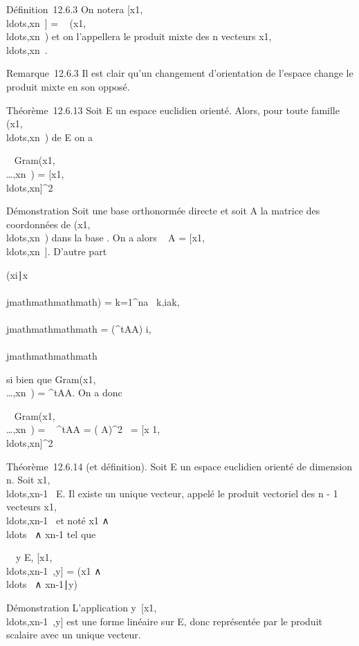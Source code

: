 Définition~12.6.3 On notera
{[}x1,\\ldots,xn~{]}
= ~
(x1,\\ldots,xn~)
et on l'appellera le produit mixte des n vecteurs
x1,\\ldots,xn~.

Remarque~12.6.3 Il est clair qu'un changement d'orientation de l'espace
change le produit mixte en son opposé.

Théorème~12.6.13 Soit E un espace euclidien orienté. Alors, pour toute
famille
(x1,\\ldots,xn~)
de E on a

~
Gram(x1,\\\ldots,xn~)
=
{[}x1,\\ldots,xn{]}^2~

Démonstration Soit  une base orthonormée directe et soit A la matrice
des coordonnées de
(x1,\\ldots,xn~)
dans la base . On a alors
~ A =
{[}x1,\\ldots,xn~{]}.
D'autre part

(xi∣x\\\\jmathmathmathmath) =
\sum k=1^na~
k,iak,\\\\jmathmathmathmath = (^tAA) i,\\\\jmathmathmathmath

si bien que
Gram(x1,\\\ldots,xn~)
= ^tAA. On a donc

~
Gram(x1,\\\ldots,xn~)
= ~
^tAA =
( A)^2~
= {[}x
1,\\ldots,xn{]}^2~

Théorème~12.6.14 (et définition). Soit E un espace euclidien orienté de
dimension n. Soit
x1,\\ldots,xn-1~
\in E. Il existe un unique vecteur, appelé le produit vectoriel des n - 1
vecteurs
x1,\\ldots,xn-1~
et noté x1
∧\\ldots~ ∧
xn-1 tel que

\forall~~y \in E,
{[}x1,\\ldots,xn-1~,y{]}
= (x1
∧\\ldots~ ∧
xn-1∣y)

Démonstration L'application
y\mapsto~{[}x1,\\ldots,xn-1~,y{]}
est une forme linéaire sur E, donc représentée par le produit scalaire
avec un unique vecteur.

